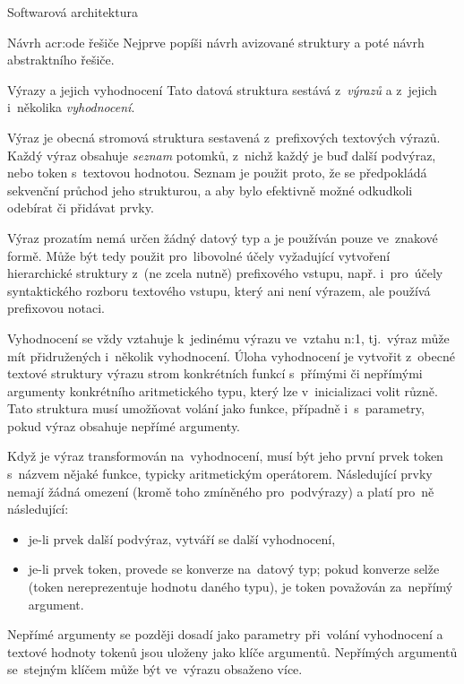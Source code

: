 \documentclass[thesis=M,czech]{FITthesis}[2012/06/26]
\newcommand{\acrlabel}[1]{acr:#1}
\newcommand{\acr}[1]{\acrshort{\acrlabel{#1}}}
\newcommand{\hl}[1]{\textit{#1}}
\newcommand{\name}[1]{\hl{#1}}
\begin{document}
\begin{section}{Softwarová architektura}
\begin{subsection}{Návrh \acr{ode} řešiče}
Nejprve popíši návrh avizované struktury
a poté návrh abstraktního řešiče.


\begin{subsubsection}{Výrazy a jejich vyhodnocení}
\label{sss:design:arch:ode:exprs}
Tato datová struktura sestává
z~\name{výrazů} a z~jejich i~několika \hl{vyhodnocení}.


\begin{paragraph}{Výraz}\label{p:design:arch:ode:exprs:expr}
je obecná stromová struktura
sestavená z~prefixových textových výrazů.
Každý výraz obsahuje \hl{seznam} potomků,
z~nichž každý je buď další podvýraz,
nebo token s~textovou hodnotou.
Seznam je použit proto,
že se předpokládá sekvenční průchod jeho strukturou,
a aby bylo efektivně možné odkudkoli odebírat či přidávat prvky.

Výraz prozatím nemá určen žádný datový typ
a je používán pouze ve~znakové formě.
Může být tedy použit pro~libovolné účely
vyžadující vytvoření hierarchické struktury
z~(ne zcela nutně) prefixového vstupu,
např. i~pro~účely syntaktického rozboru
textového vstupu, který ani není výrazem,
ale používá prefixovou notaci.
\end{paragraph} %


\begin{paragraph}{Vyhodnocení}\label{p:design:arch:ode:exprs:eval}
se vždy vztahuje k~jedinému výrazu ve~vztahu n:1,
tj.~výraz může mít přidružených i~několik vyhodnocení.
Úloha vyhodnocení je vytvořit z~obecné textové struktury
výrazu strom konkrétních funkcí s~přímými či nepřímými argumenty
konkrétního aritmetického typu,
který lze v~inicializaci volit různě.
Tato struktura musí umožňovat volání jako funkce,
případně i~s~parametry,
pokud výraz obsahuje nepřímé argumenty.

Když je výraz transformován na~vyhodnocení,
musí být jeho první prvek token s~názvem nějaké funkce,
typicky aritmetickým operátorem.
Následující prvky nemají žádná omezení
(kromě toho zmíněného pro~podvýrazy)
a platí pro~ně následující:
\begin{itemize}
\item je-li prvek další podvýraz, vytváří se další vyhodnocení,
\item je-li prvek token, provede se konverze na~datový typ;
   pokud konverze selže (token nereprezentuje hodnotu daného typu),
   je token považován za~nepřímý argument.
\end{itemize}
Nepřímé argumenty se později dosadí
jako parametry při~volání vyhodnocení
a textové hodnoty tokenů jsou uloženy jako klíče argumentů.
Nepřímých argumentů se~stejným klíčem
může být ve~výrazu obsaženo více.
\end{paragraph} %


\end{subsubsection}
\end{subsection}
\end{section}
\end{document}
